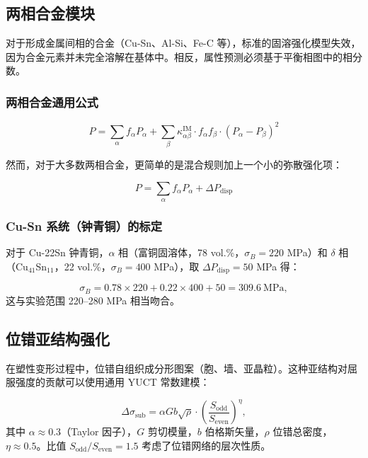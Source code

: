 \documentclass[12pt,a4paper]{article}
\begin{document}
	\subsection{两相合金模块}
	\label{subsec:two-phase-alloys}
	
	对于形成金属间相的合金（Cu-Sn、Al-Si、Fe-C 等），标准的固溶强化模型失效，因为合金元素并未完全溶解在基体中。相反，属性预测必须基于平衡相图中的相分数。
	
	\subsubsection{两相合金通用公式}
	
	\begin{equation}
		\boxed{P = \sum_{\alpha} f_{\alpha} P_{\alpha} + \sum_{\beta} \kappa_{\alpha\beta}^{\text{IM}} \cdot f_{\alpha} f_{\beta} \cdot (P_{\alpha} - P_{\beta})^2}
		\label{eq:two-phase-alloy}
	\end{equation}
	
	然而，对于大多数两相合金，更简单的是混合规则加上一个小的弥散强化项：
	
	\begin{equation}
		\boxed{P = \sum_{\alpha} f_{\alpha} P_{\alpha} + \Delta P_{\text{disp}}}
		\label{eq:two-phase-simple}
	\end{equation}
	
	\subsubsection{Cu-Sn 系统（钟青铜）的标定}
	对于 Cu-22Sn 钟青铜，\(\alpha\) 相（富铜固溶体，78 vol.\%，\(\sigma_B=220\) MPa）和 \(\delta\) 相（Cu\(_{41}\)Sn\(_{11}\)，22 vol.\%，\(\sigma_B=400\) MPa），取 \(\Delta P_{\text{disp}}=50\) MPa 得：
	
	\[
	\sigma_B = 0.78 \times 220 + 0.22 \times 400 + 50 = 309.6\ \text{MPa},
	\]
	这与实验范围 220–280 MPa 相当吻合。
	
	\subsection{位错亚结构强化}
	\label{subsec:dislocation-substructure}
	
	在塑性变形过程中，位错自组织成分形图案（胞、墙、亚晶粒）。这种亚结构对屈服强度的贡献可以使用通用 YUCT 常数建模：
	
	\[
	\Delta\sigma_{\text{sub}} = \alpha G b \sqrt{\rho} \cdot \left( \frac{S_{\text{odd}}}{S_{\text{even}}} \right)^{\eta},
	\]
	其中 \(\alpha \approx 0.3\)（Taylor 因子），\(G\) 剪切模量，\(b\) 伯格斯矢量，\(\rho\) 位错总密度，\(\eta \approx 0.5\)。比值 \(S_{\text{odd}}/S_{\text{even}}=1.5\) 考虑了位错网络的层次性质。
	
\end{document}
